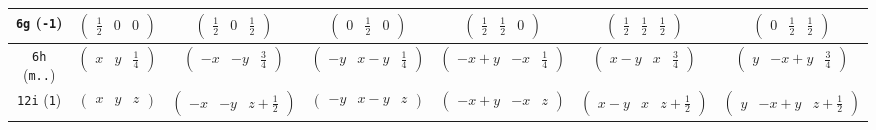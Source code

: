 \documentclass[fleqn,9pt,landscape]{jsarticle}
\begin{document}
\begin{center}
\begin{longtable}{ccccccc}
{\tt 6g} ({\tt -1}) & $ \begin{pmatrix} \frac{1}{2} & 0 & 0 \end{pmatrix} $ & $ \begin{pmatrix} \frac{1}{2} & 0 & \frac{1}{2} \end{pmatrix} $ & $ \begin{pmatrix} 0 & \frac{1}{2} & 0 \end{pmatrix} $ & $ \begin{pmatrix} \frac{1}{2} & \frac{1}{2} & 0 \end{pmatrix} $ & $ \begin{pmatrix} \frac{1}{2} & \frac{1}{2} & \frac{1}{2} \end{pmatrix} $ & $ \begin{pmatrix} 0 & \frac{1}{2} & \frac{1}{2} \end{pmatrix} $ \\ \hline
{\tt 6h} ({\tt m..}) & $ \begin{pmatrix} x & y & \frac{1}{4} \end{pmatrix} $ & $ \begin{pmatrix} - x & - y & \frac{3}{4} \end{pmatrix} $ & $ \begin{pmatrix} - y & x - y & \frac{1}{4} \end{pmatrix} $ & $ \begin{pmatrix} - x + y & - x & \frac{1}{4} \end{pmatrix} $ & $ \begin{pmatrix} x - y & x & \frac{3}{4} \end{pmatrix} $ & $ \begin{pmatrix} y & - x + y & \frac{3}{4} \end{pmatrix} $ \\ \hline
{\tt 12i} ({\tt 1}) & $ \begin{pmatrix} x & y & z \end{pmatrix} $ & $ \begin{pmatrix} - x & - y & z + \frac{1}{2} \end{pmatrix} $ & $ \begin{pmatrix} - y & x - y & z \end{pmatrix} $ & $ \begin{pmatrix} - x + y & - x & z \end{pmatrix} $ & $ \begin{pmatrix} x - y & x & z + \frac{1}{2} \end{pmatrix} $ & $ \begin{pmatrix} y & - x + y & z + \frac{1}{2} \end{pmatrix} $ \\

\end{longtable}
\end{center}
\end{document}
